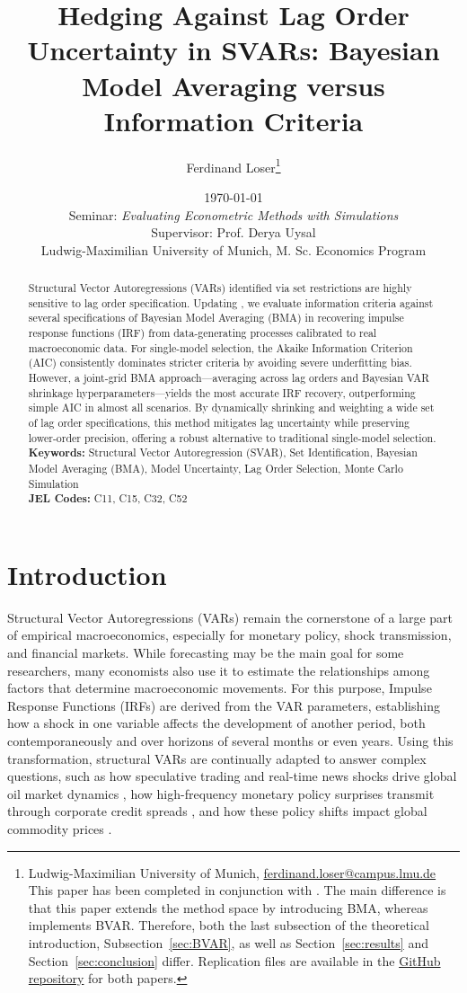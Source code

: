 \documentclass[12pt, a4paper]{article}
\title{Hedging Against Lag Order Uncertainty in SVARs: Bayesian Model Averaging versus Information Criteria}
\author{
    Ferdinand Loser\thanks{Ludwig-Maximilian University of Munich, \href{mailto:ferdinand.loser@campus.lmu.de}{ferdinand.loser@campus.lmu.de} \\ This paper has been completed in conjunction with \citet{AydinBVAR2026}. The main difference is that this paper extends the method space by introducing BMA, whereas \citet{AydinBVAR2026} implements BVAR. Therefore, both the last subsection of the theoretical introduction, Subsection~\ref{sec:BVAR}, as well as Section~\ref{sec:results} and Section~\ref{sec:conclusion} differ. Replication files are available in the \href{https://github.com/FerdinandLos/Monte-Carlo-Coding}{GitHub repository} for both papers.}
}
\date{\today \\ \vspace{0.5cm} Seminar: \textit{Evaluating Econometric Methods with Simulations} \\ Supervisor: Prof. Derya Uysal \\ \vspace{0.5cm} Ludwig-Maximilian University of Munich, M. Sc. Economics Program}
\begin{document}
\maketitle

\begin{abstract}
\noindent
Structural Vector Autoregressions (VARs) identified via set restrictions are highly sensitive to lag order specification. Updating \citet{ivanovPractitionersGuideLag2005}, we evaluate information criteria against several specifications of Bayesian Model Averaging (BMA) in recovering impulse response functions (IRF) from data-generating processes calibrated to real macroeconomic data. For single-model selection, the Akaike Information Criterion (AIC) consistently dominates stricter criteria by avoiding severe underfitting bias. However, a joint-grid BMA approach—averaging across lag orders and Bayesian VAR shrinkage hyperparameters—yields the most accurate IRF recovery, outperforming simple AIC in almost all scenarios. By dynamically shrinking and weighting a wide set of lag order specifications, this method mitigates lag uncertainty while preserving lower-order precision, offering a robust alternative to traditional single-model selection.
\vspace{1em}\\
\noindent\textbf{Keywords:} Structural Vector Autoregression (SVAR), Set Identification, Bayesian Model Averaging (BMA), Model Uncertainty, Lag Order Selection, Monte Carlo Simulation \\
\noindent\textbf{JEL Codes:} C11, C15, C32, C52 %
\end{abstract}

\newpage

\section{Introduction}
\label{sec:introduction}
Structural Vector Autoregressions (VARs) remain the cornerstone of a large part of empirical macroeconomics, especially for monetary policy, shock transmission, and financial markets. While forecasting may be the main goal for some researchers, many economists also use it to estimate the relationships among factors that determine macroeconomic movements. For this purpose, Impulse Response Functions (IRFs) are derived from the VAR parameters, establishing how a shock in one variable affects the development of another period, both contemporaneously and over horizons of several months or even years. Using this transformation, structural VARs are continually adapted to answer complex questions, such as how speculative trading and real-time news shocks drive global oil market dynamics \citep{kilianRoleInventoriesSpeculative2014, gazzaniOilPriceShocks2024, castelnuovoCommodityPriceShocks2024}, how high-frequency monetary policy surprises transmit through corporate credit spreads \citep{gertlerMonetaryPolicySurprises2015, ferreiraFirmFinancialConditions2023}, and how these policy shifts impact global commodity prices \citep{miranda-pintoMonetaryPolicyTransmission2023}. 
\end{document}
